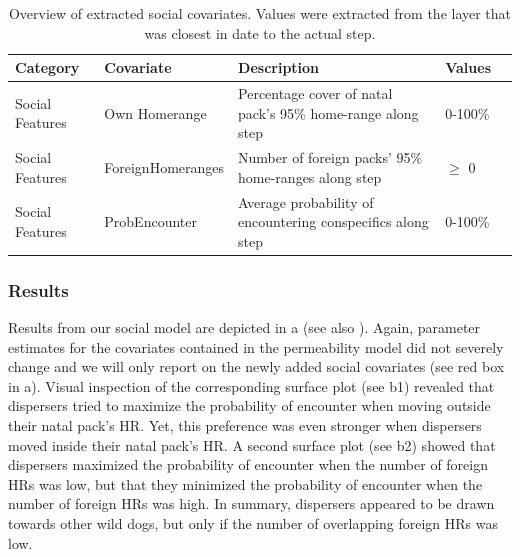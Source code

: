 \documentclass[abstract=on,10pt,a4paper,bibliography=totocnumbered]{scrartcl}
\begin{document}
\begin{table}[h]
  \begin{center}
    \caption{Overview of extracted social covariates. Values were extracted from
    the layer that was closest in date to the actual step.}
    \label{SocialCovars}
    \resizebox{\textwidth}{!} {
      \begin{tabular}{lllll}
      \hline
      \textbf{Category} &
        \textbf{Covariate} &
          \textbf{Description} &
            \textbf{Values} \\
      \midrule
      Social Features
        & Own Homerange
          & Percentage cover of natal pack’s 95\% home-range along step
            & 0-100\% \\
      Social Features
        & ForeignHomeranges
          & Number of foreign packs’ 95\% home-ranges along step
            & \(\geq\) 0 \\
      Social Features
        & ProbEncounter
          & Average probability of encountering conspecifics along step
            & 0-100\% \\
      \hline
      \end{tabular}
    }
  \end{center}
\end{table}

\newpage
\subsubsection{Results}
Results from our social model are depicted in a (see also
). Again, parameter estimates for the covariates
contained in the permeability model did not severely change and we will only
report on the newly added social covariates (see red box in
a). Visual inspection of the corresponding surface plot (see
b1) revealed that dispersers tried to maximize the probability
of encounter when moving outside their natal pack's HR. Yet, this preference was
even stronger when dispersers moved inside their natal pack's HR. A second
surface plot (see b2) showed that dispersers maximized the
probability of encounter when the number of foreign HRs was low, but that they
minimized the probability of encounter when the number of foreign HRs was high.
In summary, dispersers appeared to be drawn towards other wild dogs, but only if
the number of overlapping foreign HRs was low.
\end{document}
